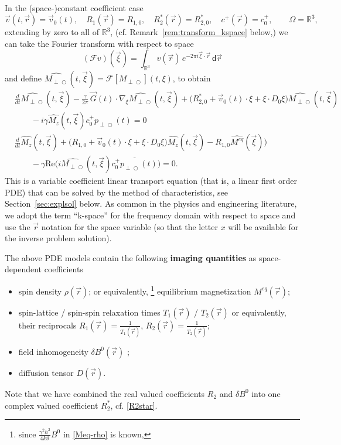 \documentclass{ws-m3as}
\renewcommand\Re{\mathrm{Re}}
\def\Mpp{M_{\perp\!\!\!\!\!\bigcirc}}
\def\Mphp{\widehat{\Mpp}}
\def\pp{p_{\perp\!\!\!\!\!\bigcirc}}
\begin{document}
In the (space-)constant coefficient case 
\begin{equation}\label{fullspace}
\vec v(t,\vec r)=\vec v_0(t)%
, \quad 
R_1(\vec r)=R_{1,0}%
, \quad 
R_2^*(\vec r)=R_{2,0}^*%
, \quad
c^+(\vec r)=c^+_0,
\qquad\Omega=\mathbb{R}^3,
\end{equation}
extending by zero to all of $\mathbb{R}^3$, (cf. Remark~\ref{rem:transform_kspace} below,) 
we can take the Fourier transform with respect to space 
\begin{equation}\label{Fouriertransf}
(\mathcal{F}v)(\vec \xi)=\int_{\mathbb{R}^3} v(\vec r) \, e^{-2\pi i {\vec \xi}\cdot{\vec r}}  \,\textsf{d}\vec r
\end{equation}
and define $\Mphp(t,\vec\xi)=\mathcal{F}[\Mpp](t,\xi)$,
to obtain
\begin{equation}\label{eqn:bloch-torrey-complex_rot_FT}
\begin{aligned}
&\frac{d}{dt}\Mphp(t,\vec\xi) - \frac{\gamma}{2\pi}\,\vec G(t)\cdot \nabla_\xi \Mphp(t,\vec\xi)
+\bigl(R_{2,0}^*+\vec v_0(t)\cdot\xi+\xi\cdot D_0\xi \bigr)\Mphp(t,\vec\xi)\\
&\qquad-i\gamma \widehat{M_z}(t, \vec\xi)c^+_0 \pp(t)=0\\    
&\frac{d}{dt}\widehat{M_z}(t, \vec\xi) 
+\bigl(R_{1,0}+\vec v_0(t)\cdot\xi+\xi\cdot D_0\xi\bigr)\widehat{M_z}(t, \vec\xi)-R_{1,0}\widehat{M^{eq}}(\vec\xi))\\
&\qquad-\gamma\Re\bigl(i\Mphp(t, \vec\xi)\overline{c^+_0 \pp(t)}\bigr)=0.
\end{aligned}
\end{equation}
This is a variable coefficient linear transport equation (that is, a linear first order PDE) that can be solved by the method of characteristics, see Section~\ref{sec:explsol} below.
As common in the physics and engineering literature, we adopt the term ``k-space'' for the frequency domain with respect to space and use the $\vec r$ notation for the space variable (so that the letter $x$ will be available for the inverse problem solution). 


The above PDE models contain the following \textbf{imaging quantities} as space-dependent coefficients
\begin{itemize}
\item spin density $\rho(\vec r)$; or equivalently, \footnote{since $\frac{\gamma^2 h^2}{4k\vartheta}B^0$ in \eqref{Meq-rho} is known,}
equilibrium magnetization $M^{eq}(\vec r)$; 
\item spin-lattice / spin-spin relaxation times $T_1(\vec r)$ / $T_2(\vec r)$ or equivalently, their reciprocals 
$R_1(\vec r)=\frac{1}{T_1(\vec r)}$, $R_2(\vec r)=\frac{1}{T_2(\vec r)}$;
\item field inhomogeneity $\delta B^0(\vec r)$ ;
\item diffusion 
tensor $D(\vec r)$.
\end{itemize}
Note that we have combined the real valued coefficients $R_2$ and $\delta B^0$ into one complex valued coefficient $R_2^*$, cf. \eqref{R2star}. 
\end{document}
